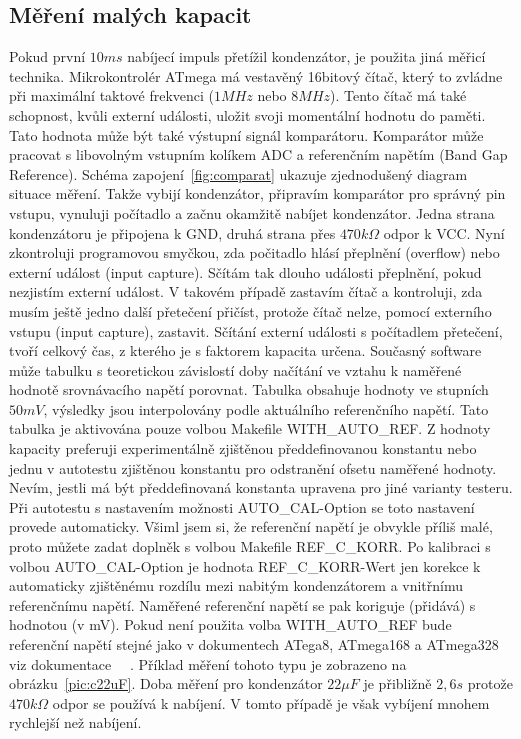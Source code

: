 \subsection{Měření malých kapacit}
Pokud první \(10ms\) nabíjecí impuls přetížil kondenzátor, je použita jiná měřicí technika.
Mikrokontrolér ATmega má vestavěný 16bitový čítač, který to zvládne při maximální
taktové frekvenci (\(1MHz\) nebo \(8MHz\)).
Tento čítač má také schopnost, kvůli externí události, uložit svoji momentální hodnotu do paměti.
Tato hodnota může být také výstupní signál komparátoru.
Komparátor může pracovat s libovolným vstupním kolíkem ADC a referenčním napětím (Band Gap Reference).
Schéma zapojení~\ref{fig:comparat} ukazuje zjednodušený diagram situace měření.
Takže vybijí kondenzátor, připravím komparátor pro správný pin vstupu,
vynuluji počítadlo a začnu okamžitě nabíjet kondenzátor.
Jedna strana kondenzátoru je připojena k GND, druhá strana přes \(470k\Omega\) odpor k VCC.
Nyní zkontroluji programovou smyčkou, zda počitadlo hlásí přeplnění (overflow)
nebo externí událost (input capture).
Sčítám tak dlouho události přeplnění, pokud nezjistím externí událost.
V takovém případě zastavím čítač a kontroluji, zda musím ještě jedno další přetečení přičíst,
protože čítač nelze, pomocí externího vstupu (input capture), zastavit.
Sčítání externí události s počítadlem přetečení, tvoří celkový čas, z kterého je s faktorem kapacita určena.
Současný software může tabulku s teoretickou závislostí doby načítání ve vztahu k naměřené 
hodnotě srovnávacího napětí porovnat.
Tabulka obsahuje hodnoty ve stupních \(50mV\), výsledky jsou interpolovány podle aktuálního referenčního napětí.
Tato tabulka je aktivována pouze volbou Makefile WITH\_AUTO\_REF.
Z hodnoty kapacity preferuji experimentálně zjištěnou předdefinovanou konstantu nebo jednu v autotestu
zjištěnou konstantu pro odstranění ofsetu naměřené hodnoty.
Nevím, jestli má být předdefinovaná konstanta upravena pro jiné varianty testeru.
Při autotestu s nastavením možnosti AUTO\_CAL-Option se toto nastavení provede automaticky.
Všiml jsem si, že referenční napětí je obvykle příliš malé, proto můžete zadat doplněk s 
volbou Makefile REF\_C\_KORR.
Po kalibraci s volbou AUTO\_CAL-Option je hodnota REF\_C\_KORR-Wert jen korekce k automaticky
zjištěnému rozdílu mezi nabitým kondenzátorem a vnitřnímu referenčnímu napětí.
Naměřené referenční napětí se pak koriguje (přidává) s hodnotou (v mV).
Pokud není použita volba WITH\_AUTO\_REF bude referenční napětí stejné jako v
dokumentech ATega8, ATmega168 a ATmega328 viz dokumentace ~\cite{ATmega8}~\cite{ATmega168}.
Příklad měření tohoto typu je zobrazeno na obrázku~\ref{pic:c22uF}.
Doba měření pro kondenzátor \(22\mu F\)  je přibližně \(2,6s\) protože \(470k\Omega\) odpor se používá k nabíjení.
V tomto případě je však vybíjení mnohem rychlejší než nabíjení.

